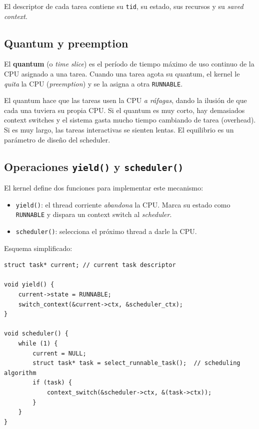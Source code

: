 \documentclass[11pt,a4paper]{article}
\begin{document}
El descriptor de cada tarea contiene su \texttt{tid}, su estado, sus
recursos y su \emph{saved context}.

\subsection{Quantum y preemption}

\begin{definicion}
El \textbf{quantum} (o \emph{time slice}) es el período de tiempo
máximo de uso continuo de la CPU asignado a una tarea. Cuando una
tarea agota su quantum, el kernel le \emph{quita} la CPU
(\emph{preemption}) y se la asigna a otra \texttt{RUNNABLE}.
\end{definicion}

\begin{idea}
El quantum hace que las tareas usen la CPU \emph{a ráfagas}, dando la
ilusión de que cada una tuviera su propia CPU. Si el quantum es muy
corto, hay demasiados context switches y el sistema gasta mucho
tiempo cambiando de tarea (overhead). Si es muy largo, las tareas
interactivas se sienten lentas. El equilibrio es un parámetro de
diseño del scheduler.
\end{idea}

\subsection{Operaciones \texttt{yield()} y \texttt{scheduler()}}

El kernel define dos funciones para implementar este mecanismo:

\begin{itemize}[leftmargin=*,nosep]
    \item \texttt{yield()}: el thread corriente \emph{abandona} la CPU.
        Marca su estado como \texttt{RUNNABLE} y dispara un context
        switch al \emph{scheduler}.
    \item \texttt{scheduler()}: selecciona el próximo thread a darle
        la CPU.
\end{itemize}

Esquema simplificado:

\begin{lstlisting}[style=cstyle]
struct task* current; // current task descriptor

void yield() {
    current->state = RUNNABLE;
    switch_context(&current->ctx, &scheduler_ctx);
}

void scheduler() {
    while (1) {
        current = NULL;
        struct task* task = select_runnable_task();  // scheduling algorithm
        if (task) {
            context_switch(&scheduler->ctx, &(task->ctx));
        }
    }
}
\end{lstlisting}
\end{document}
